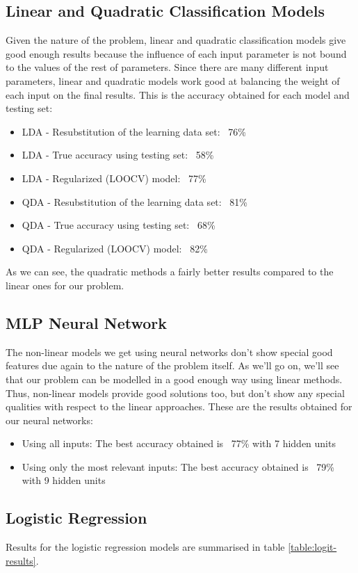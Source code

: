 \documentclass[english]{scrartcl}
\begin{document}
    \subsection{Linear and Quadratic Classification Models}
    Given the nature of the problem, linear and quadratic classification models give good enough results because the influence
    of each input parameter is not bound to the values of the rest of parameters. Since there are many different input parameters,
    linear and quadratic models work good at balancing the weight of each input on the final results. This is the accuracy
    obtained for each model and testing set:
    \begin{itemize}
    \item LDA - Resubstitution of the learning data set: ~76\%
    \item LDA - True accuracy using testing set: ~58\%
    \item LDA - Regularized (LOOCV) model: ~77\%
    \item QDA - Resubstitution of the learning data set: ~81\%
    \item QDA - True accuracy using testing set: ~68\%
    \item QDA - Regularized (LOOCV) model: ~82\%
    \end{itemize}
    As we can see, the quadratic methods a fairly better results compared to the linear ones for our problem.
    
    \subsection{MLP Neural Network}\label{sec:results:nnet}
    The non-linear models we get using neural networks don't show special good features due again to the nature of the problem itself.
    As we'll go on, we'll see that our problem can be modelled in a good enough way using linear methods. Thus, non-linear models provide
    good solutions too, but don't show any special qualities with respect to the linear approaches. These are the results obtained for
    our neural networks:
    \begin{itemize}
    \item Using all inputs: The best accuracy obtained is ~77\% with 7 hidden units
    \item Using only the most relevant inputs: The best accuracy obtained is ~79\% with 9 hidden units
    \end{itemize}
    
    \subsection{Logistic Regression}
    Results for the logistic regression models are summarised in table \ref{table:logit-results}.
    
\end{document}
